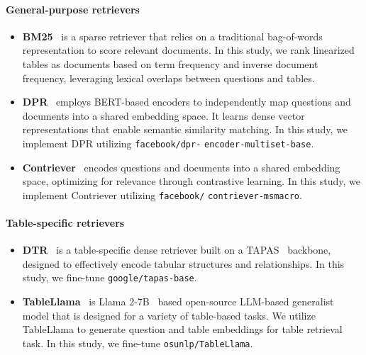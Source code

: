 \paragraph{General-purpose retrievers}
\begin{itemize}[leftmargin=*,topsep=4pt,itemsep=4pt,parsep=0pt]

    \item\textbf{BM25}~\citep{Robertson2009ThePR} is a sparse retriever that relies on a traditional bag-of-words representation to score relevant documents.
    In this study, we rank linearized tables as documents based on term frequency and inverse document frequency, leveraging lexical overlaps between questions and tables.

    \item\textbf{DPR}~\citep{Karpukhin2020DensePR} employs BERT-based encoders to independently map questions and documents into a shared embedding space.
    It learns dense vector representations that enable semantic similarity matching.
    In this study, we implement DPR utilizing \texttt{facebook/dpr-} \texttt{encoder-multiset-base}.

    \item\textbf{Contriever}~\citep{Izacard2021UnsupervisedDI} encodes questions and documents into a shared embedding space, optimizing for relevance through contrastive learning.
    In this study, we implement Contriever utilizing \texttt{facebook/} \texttt{contriever-msmacro}.

\end{itemize}

\paragraph{Table-specific retrievers}
\begin{itemize}[leftmargin=*,topsep=4pt,itemsep=4pt,parsep=0pt]

    \item\textbf{DTR}~\citep{Herzig2021OpenDQ} is a table-specific dense retriever built on a TAPAS~\citep{Herzig2020TaPasWS} backbone, designed to effectively encode tabular structures and relationships.
    In this study, we fine-tune \texttt{google/tapas-base}.

    \item\textbf{TableLlama}~\citep{Zhang2023TableLlamaTO} is Llama 2-7B~\citep{Touvron2023Llama2O} based open-source LLM-based generalist model that is designed for a variety of table-based tasks.
    We utilize TableLlama to generate question and table embeddings for table retrieval task.
    In this study, we fine-tune \texttt{osunlp/TableLlama}.

\end{itemize}

